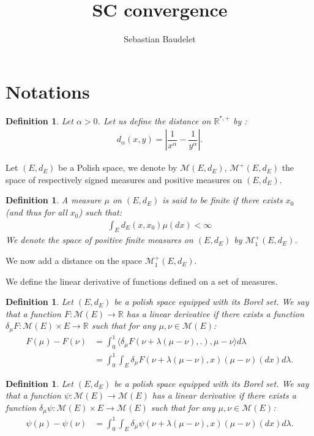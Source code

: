 \documentclass[11pt,a4paper]{article}
\title{}      %
\author{
   Sebastian Baudelet
}
\title{SC convergence}
\date{}
\newcommand{\RR}{\mathbb{R}}
\newcommand{\MC}{\mathcal{M}}
\newtheorem{definition}[theorem]{Definition}
\begin{document}
\maketitle
\section{Notations}
\begin{definition}
    Let $\alpha > 0$. Let us define the distance on $\RR^{*,+}$ by :
    \begin{align*}
        d_\alpha(x,y) = \left|\dfrac{1}{x^{\alpha}} - \dfrac{1}{y^{\alpha}}\right|.
    \end{align*}
\end{definition}
Let $(E,d_E)$ be a Polish space, we denote by $\MC(E,d_E)$, $\MC^+(E,d_E)$  the space of respectively signed measures and positive measures on $(E,d_E)$.
\begin{definition}
    A measure $\mu$ on $(E,d_E)$ is said to be finite if there exists $x_0$ (and thus for all $x_0$) such that:
    \begin{align*}
        \int_E d_E(x,x_0) \mu(dx) < \infty
    \end{align*}
    We denote the space of positive finite measures on $(E,d_E)$ by $\MC_1^+\left(E,d_E\right)$.
\end{definition}
We now add a distance on the space $\MC_1^+\left(E,d_E\right)$. 

We define the linear derivative of functions defined on a set of measures.
\begin{definition}
    Let $(E,d_E)$ be a polish space equipped with its Borel set. We say that a function $F : \MC(E) \to \RR$ has a linear derivative if there exists a function $\delta_\mu F : \MC(E)\times E \to \RR$ such that for any $\mu,\nu \in \MC(E)$:
    \begin{align*}
        F(\mu) - F(\nu) &= \int_0^1  \langle \delta_\mu F\left(\nu + \lambda(\mu -\nu),.\right), \mu - \nu\rangle d\lambda\\
        &= \int_0^1  \int_E \delta_\mu F\left(\nu + \lambda(\mu -\nu),x\right) \left(\mu - \nu\right)(dx)  d\lambda.
    \end{align*}
\end{definition}

\begin{definition}
    Let $(E,d_E)$ be a polish space equipped with its Borel set. We say that a function $\psi : \MC(E) \to \MC(E)$ has a linear derivative if there exists a function $\delta_\mu \psi : \MC(E)\times E \to \MC(E)$ such that for any $\mu,\nu \in \MC(E)$:
    \begin{align*}
        \psi(\mu) - \psi(\nu) &= \int_0^1  \int_E \delta_\mu \psi\left(\nu + \lambda(\mu -\nu),x\right) \left(\mu - \nu\right)(dx)  d\lambda.
    \end{align*}
\end{definition}
\end{document}
